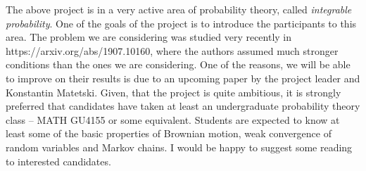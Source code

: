 \documentclass[a4paper, 11pt]{amsart}
\newcounter{theo}[section]\setcounter{theo}{0}
\begin{document}
The above project is in a very active area of probability theory, called {\em integrable probability}. One of the goals of the project is to introduce the participants to this area. The problem we are considering was studied very recently in https://arxiv.org/abs/1907.10160, where the authors assumed much stronger conditions than the ones we are considering. One of the reasons, we will be able to improve on their results is due to an upcoming paper by the project leader and Konstantin Matetski. Given, that the project is quite ambitious, it is strongly preferred that candidates have taken at least an undergraduate probability theory class -- MATH GU4155 or some equivalent. Students are expected to know at least some of the basic properties of Brownian motion, weak convergence of random variables and Markov chains. I would be happy to suggest some reading to interested candidates.
\end{document}
